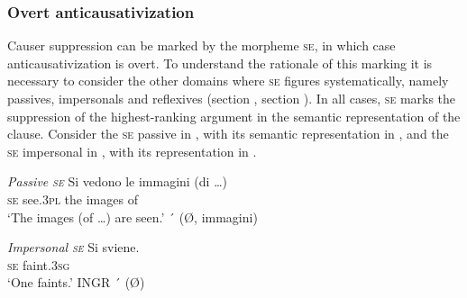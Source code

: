 \documentclass[output=paper,colorlinks,citecolor=brown
]{langscibook}
\begin{document}
\subsubsection{Overt anticausativization}
\label{bentley_section_5.4.1}
Causer suppression can be marked by the morpheme \textsc{se}, in which case anticausativization is overt. To understand the rationale of this marking it is necessary to consider the other domains where \textsc{se} figures systematically, namely passives, impersonals and reflexives (section , section ). In all cases, \textsc{se} marks the suppression of the highest-ranking argument in the semantic representation of the clause. Consider the \textsc{se} passive in , with its semantic representation in , and the \textsc{se} impersonal in , with its representation in .

\ea \label{bentley_example_51}
    \textit{Passive \textsc{se}}
    \ea \label{bentley_example_51a}
    \gll Si		vedono	le		immagini (di \ldots ) \\
    \textsc{se}		see.3\textsc{pl}		the	images		of \\
    \glt 	‘The images (of \ldots ) are seen.’
    \ex \label{bentley_example_51b}
    ´ (Ø, immagini)
    \z
\z

\ea \label{bentley_example_52}
    \textit{Impersonal \textsc{se}}
    \ea \label{bentley_example_52a}
    \gll Si 	sviene.\\
    \textsc{se}		faint.3\textsc{sg}	 \\
    \glt 	‘One faints.’
    \ex \label{bentley_example_52b}
    INGR ´ (Ø)
    \z
\z
\end{document}
